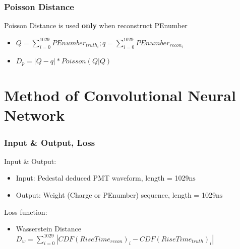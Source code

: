 \documentclass[handout]{beamer}
\begin{document}
\begin{frame}
\frametitle{Poisson Distance}
\hspace{4mm}Poisson Distance is used \textbf{only} when reconstruct PEnumber
\begin{itemize}
    \item $Q = \sum_{i=0}^{1029}PEnumber_{truth_i}; q = \sum_{i=0}^{1029}PEnumber_{recon_i}$
    \item $D_{p} = |Q-q|*Poisson(Q|Q)$
\end{itemize}
\end{frame}

\section{Method of Convolutional Neural Network}

\begin{frame}
\frametitle{Input \& Output, Loss}
\hspace{4mm}Input \& Output:
\begin{itemize}
    \item Input: Pedestal deduced PMT waveform, length = 1029$\mathrm{ns}$
    \item Output: Weight (Charge or PEnumber) sequence, length = 1029$\mathrm{ns}$
\end{itemize}
\hspace{4mm}Loss function:
\begin{itemize}
    \item Wasserstein Distance \\ $D_{w}=\sum_{i=0}^{1029}|CDF(RiseTime_{recon})_{i} - CDF(RiseTime_{truth})_{i}|$
\end{itemize}
\end{frame}
\end{document}
